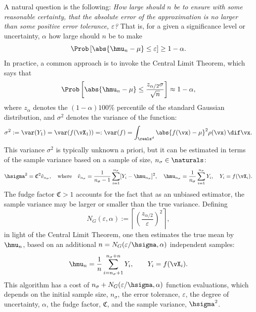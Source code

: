\documentclass[graybox]{svmult}
\newcommand{\hv}{\hat{v}}
\newcommand{\fudge}{\mathfrak{C}}
\begin{document}
A natural question is the following: \emph{How large should $n$ be to ensure with some reasonable certainty, that the absolute error of the approximation is no larger than some positive error tolerance, $\varepsilon$?}  That is, for a given a significance level or uncertainty, $\alpha$ how large should $n$ be to make 
\begin{equation} \label{abserr}
\Prob\left[\abs{\hmu_n-\mu} \le \varepsilon \right] \geq 1-\alpha.
\end{equation}
In practice, a common approach is to invoke the Central Limit Theorem, which says that
\begin{equation} \label{CLT}
\Prob\left[\abs{\hmu_n-\mu} \le \frac{z_{\alpha/2} \sigma}{\sqrt{n}} \right] \approx 1-\alpha,
\end{equation}
where $z_\alpha$ denotes the $(1-\alpha)100\%$ percentile of the standard Gaussian distribution, and $\sigma^2$ denotes the variance of the function:
\begin{equation} \label{sigmadef}
\sigma^2 := \var(Y_1) = \var(f(\vX_1)) =: \var(f) = \int_{\reals^d} \abs{f(\vx)-\mu}^2 \rho(\vx) \, \dif \vx.
\end{equation}
This variance $\sigma^2$ is typically unknown a priori, but it can be estimated in terms of the sample variance based on a  sample of size, $n_{\sigma} \in \naturals$:
\begin{equation} \label{samplevar}
\hsigma^2 = \fudge^2 \hv_{n_{\sigma}}, \quad \text{where} \quad \hv_{n_{\sigma}} = \frac 1{n_{\sigma}-1} \sum_{i=1}^{n_{\sigma}} [Y_i- \hmu_{n_{\sigma}}]^2, \quad \hmu_{n_{\sigma}} = \frac 1{n_{\sigma}} \sum_{i=1}^{n_{\sigma}} Y_i, \quad Y_i=f(\vX_i).
\end{equation}
The fudge factor $\fudge>1$ accounts for the fact that as an unbiased estimator, the sample variance may be larger or smaller than the true variance.  Defining 
\begin{equation} \label{CLTsample}
N_{G}(\varepsilon,\alpha) :=\left \lceil \left(\frac{z_{\alpha/2}}{\varepsilon}\right)^2 \right \rceil, 
\end{equation}
in light of the Central Limit Theorem, one then estimates the true mean by $\hmu_{n}$, based on an additional $n=N_{G}(\varepsilon/\hsigma,\alpha)$ independent samples:
\begin{equation} \label{simpleMCest}
\hmu_n = \frac 1n \sum_{i=n_{\sigma}+1}^{n_{\sigma}+n} Y_i, \qquad Y_i = f(\vX_i).
\end{equation}
This algorithm has a cost of $n_{\sigma}+N_{G}(\varepsilon/\hsigma,\alpha)$ function evaluations, which depends on the initial sample size, $n_{\sigma}$, the error tolerance, $\varepsilon$, the degree of uncertainty, $\alpha$, the fudge factor, $\fudge$, and the sample variance, $\hsigma^2$.
\end{document}
